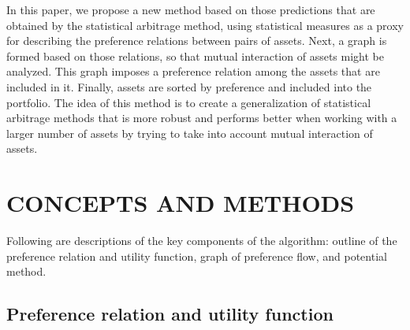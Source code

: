 \documentclass[letterpaper, 10pt, conference]{ieeeconf}
\begin{document}
  In this paper, we propose a new method based on those predictions that are obtained by the statistical arbitrage method, using statistical measures as a proxy for describing the preference relations between pairs of assets.
  Next, a graph is formed based on those relations, so that mutual interaction of assets might be analyzed.
  This graph imposes a preference relation among the assets that are included in it.
  Finally, assets are sorted by preference and included into the portfolio.
  The idea of this method is to create a generalization of statistical arbitrage methods that is more robust and performs better when working with a larger number of assets by trying to take into account mutual interaction of assets.
  
  
  
  
  \section{CONCEPTS AND METHODS}
  
  Following are descriptions of the key components of the algorithm: outline of the preference relation and utility function, graph of preference flow, and potential method.
  
  \subsection{Preference relation and utility function}
  
\end{document}
